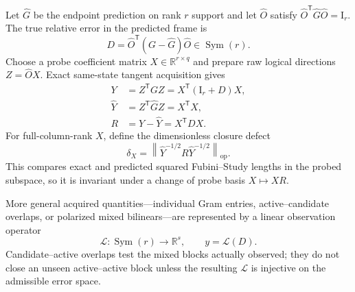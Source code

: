 \documentclass[10pt,twocolumn]{article}
\theoremstyle{definition}
\theoremstyle{remark}
\newcommand{\R}{\mathbb R}
\newcommand{\Id}{\mathrm I}
\newcommand{\op}{\mathrm{op}}
\begin{document}
Let $\widehat G$ be the endpoint prediction on rank $r$ support and let $\widehat O$ satisfy $\widehat O^{\mathsf T}\widehat G\widehat O=\Id_r$.  The true relative error in the predicted frame is
\begin{equation}
 D=\widehat O^{\mathsf T}(G-\widehat G)\widehat O\in\operatorname{Sym}(r).
 \label{eq:relativeerror}
\end{equation}
Choose a probe coefficient matrix $X\in\R^{r\times q}$ and prepare raw logical directions $Z=\widehat OX$.  Exact same-state tangent acquisition gives
\begin{align}
 Y&=Z^{\mathsf T}GZ=X^{\mathsf T}(\Id_r+D)X,\nonumber\\
 \widehat Y&=Z^{\mathsf T}\widehat GZ=X^{\mathsf T}X,\nonumber\\
 R&=Y-\widehat Y=X^{\mathsf T}DX.
 \label{eq:probeobservation}
\end{align}
For full-column-rank $X$, define the dimensionless closure defect
\begin{equation}
 \delta_X=\left\|\widehat Y^{-1/2}R\widehat Y^{-1/2}\right\|_{\op}.
 \label{eq:closuredefect}
\end{equation}
This compares exact and predicted squared Fubini--Study lengths in the probed subspace, so it is invariant under a change of probe basis $X\mapsto XR$.

More general acquired quantities---individual Gram entries, active--candidate overlaps, or polarized mixed bilinears---are represented by a linear observation operator
\begin{equation}
 \mathcal L:\operatorname{Sym}(r)\to\R^s,\qquad
 y=\mathcal L(D).
 \label{eq:linearobservation}
\end{equation}
Candidate--active overlaps test the mixed blocks actually observed; they do not close an unseen active--active block unless the resulting $\mathcal L$ is injective on the admissible error space.
\end{document}
